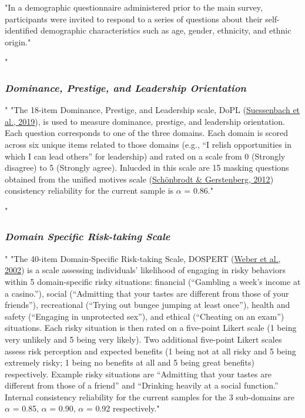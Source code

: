 \documentclass[
"  donotrepeattitle,doc, 12pt, a4paper,floatsintext]{apa7}"
\begin{document}
"In a demographic questionnaire administered prior to the main survey, participants were invited to respond to a series of questions about their self-identified demographic characteristics such as age, gender, ethnicity, and ethnic origin."
\hypertarget{dominance-prestige-and-leadership-orientation-1}{%
"\subsubsection{\texorpdfstring{\emph{Dominance, Prestige, and Leadership Orientation}}{Dominance, Prestige, and Leadership Orientation}}\label{dominance-prestige-and-leadership-orientation-1}}"
"The 18-item Dominance, Prestige, and Leadership scale, DoPL (\protect\hyperlink{ref-suessenbach2019}{Suessenbach et al., 2019}), is used to measure dominance, prestige, and leadership orientation. Each question corresponds to one of the three domains. Each domain is scored across six unique items related to those domains (e.g., ``I relish opportunities in which I can lead others'' for leadership) and rated on a scale from 0 (Strongly disagree) to 5 (Strongly agree). Inlucded in this scale are 15 masking questions obtained from the unified motives scale (\protect\hyperlink{ref-schonbrodt2012}{Schönbrodt \& Gerstenberg, 2012}) consistency reliability for the current sample is \(\alpha\) = 0.86."
\hypertarget{domain-specific-risk-taking-scale}{%
"\subsubsection{\texorpdfstring{\emph{Domain Specific Risk-taking Scale}}{Domain Specific Risk-taking Scale}}\label{domain-specific-risk-taking-scale}}"
"The 40-item Domain-Specific Risk-taking Scale, DOSPERT (\protect\hyperlink{ref-weber2002}{Weber et al., 2002}) is a scale assessing individuals' likelihood of engaging in risky behaviors within 5 domain-specific risky situations: financial (``Gambling a week's income at a casino.''), social (``Admitting that your tastes are different from those of your friends''), recreational (``Trying out bungee jumping at least once''), health and safety (``Engaging in unprotected sex''), and ethical (``Cheating on an exam'') situations. Each risky situation is then rated on a five-point Likert scale (1 being very unlikely and 5 being very likely). Two additional five-point Likert scales assess risk perception and expected benefits (1 being not at all risky and 5 being extremely risky; 1 being no benefits at all and 5 being great benefits) respectively. Example risky situations are ``Admitting that your tastes are different from those of a friend'' and ``Drinking heavily at a social function.'' Internal consistency reliability for the current samples for the 3 sub-domains are \(\alpha\) = 0.85, \(\alpha\) = 0.90, \(\alpha\) = 0.92 respectively."
\end{document}
